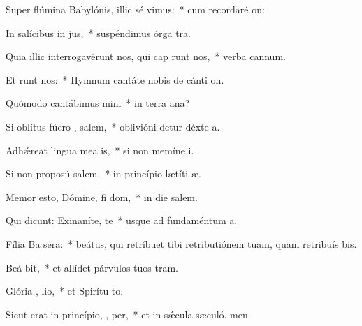 \item Super flúmina Babylónis, illic sé  vimus:~* cum recordaré on:
\item In salícibus in  jus,~* suspéndimus órga tra.
\item Quia illic interrogavérunt nos, qui cap runt nos,~* verba cannum.
\item Et  runt nos:~* Hymnum cantáte nobis de cánti on.
\item Quómodo cantábimus  mini~* in terra ana?
\item Si oblítus fúero , salem,~* oblivióni detur déxte a.
\item Adhǽreat lingua mea  is,~* si non memíne i.
\item Si non proposú salem,~* in princípio lætíti æ.
\item Memor esto, Dómine, fi dom,~* in die salem.
\item Qui dicunt: Exinaníte, te~* usque ad fundaméntum  a.
\item Fília Ba sera:~* beátus, qui retríbuet tibi retributiónem tuam, quam retribuís bis.
\item Beá  bit,~* et allídet párvulos tuos  tram.
\item Glória ,  lio,~* et Spirítu to.
\item Sicut erat in princípio,  ,  per,~* et in sǽcula sæculó. men.
